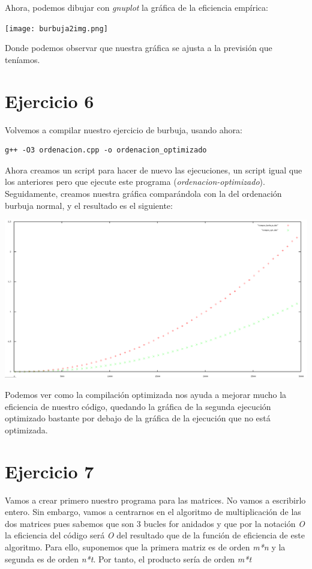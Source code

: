 \documentclass[11pt]{article}
\begin{document}
Ahora, podemos dibujar con \emph{gnuplot} la gráfica de la eficiencia empírica:

\texttt{[image: burbuja2img.png]}

Donde podemos observar que nuestra gráfica se ajusta a la previsión que teníamos.

\section*{Ejercicio 6}
\label{sec-6}

Volvemos a compilar nuestro ejercicio de burbuja, usando ahora:

\begin{verbatim}
g++ -O3 ordenacion.cpp -o ordenacion_optimizado
\end{verbatim}

Ahora creamos un script para hacer de nuevo las ejecuciones, un script igual que los anteriores pero que ejecute este programa (\emph{ordenacion-optimizado}). 
Seguidamente, creamos nuestra gráfica comparándola con la del ordenación burbuja normal, y el resultado es el siguiente:


\includegraphics[scale=0.25]{grafica6}

Podemos ver como la compilación optimizada nos ayuda a mejorar mucho la eficiencia de nuestro código, quedando la gráfica de la segunda ejecución optimizado
bastante por debajo de la gráfica de la ejecución que no está optimizada.


\section*{Ejercicio 7}
\label{sec-7}

Vamos a crear primero nuestro programa para las matrices. No vamos a escribirlo entero. Sin embargo, vamos a centrarnos en el algoritmo de multiplicación de
las dos matrices pues sabemos que son 3 bucles for anidados y que por la notación \emph{O} la eficiencia del código será \emph{O} del resultado que de la función
de eficiencia de este algoritmo.
Para ello, suponemos que la primera matriz es de orden \emph{m*n} y la segunda es de orden \emph{n*t}.
Por tanto, el producto sería de orden \emph{m*t}
\end{document}
